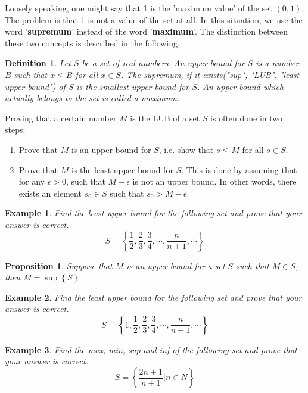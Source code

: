 \documentclass[a4paper,12pt]{article} %
\newtheorem{definition}{Definition}[section]
\newtheorem{example}{Example}[section]
\newtheorem{proposition}{Proposition}[section]
\begin{document}
Loosely speaking, one might say that 1 is the 'maximum value' of the 
set $(0,1)$. The problem is that 1 is not a value of the set at all. 
In this situation, we use the word '\textbf{supremum}' instead of the 
word '\textbf{maximum}'. The distinction between these two concepts is 
described in the following.

\begin{definition}
    Let $S$ be a set of real numbers. An upper bound for $S$ is a 
    number $B$ such that $x \le B$ for all $x \in S$. The supremum,
    if it exists("sup", "LUB", "least upper bound") of $S$ is the 
    smallest upper bound for $S$. An upper bound which actually belongs 
    to the set is called a maximum.
\end{definition}

Proving that a certain number $M$ is the LUB of a set $S$ is often 
done in two steps:
\begin{enumerate}
    \item Prove that $M$ is an upper bound for $S$, i.e. show that 
        $s \le M$ for all $s \in S$.
    \item Prove that $M$ is the least upper bound for $S$. This is 
        done by assuming that for any $\epsilon >0$, such that $M - 
        \epsilon$ is not an upper bound. In other words, there 
        exists an element $s_0 \in S$ such that $s_0 > M - \epsilon$.
\end{enumerate}

\begin{example}
    Find the least upper bound for the following set and prove that your answer is correct.
    \[
        S = \left\{\dfrac{1}{2}, \dfrac{2}{3}, \dfrac{3}{4}, \cdots,
        \dfrac{n}{n+1}, \cdots \right\}
    \]
\end{example}

\begin{proposition}
    Suppose that $M$ is an upper bound for a set $S$ such that $M \in S$, then $M = \sup\left\{S\right\}$
\end{proposition}


\begin{example}
    Find the least upper bound for the following set and prove that your answer is correct.
    \[
        S = \left\{1, \dfrac{1}{2}, \dfrac{2}{3}, \dfrac{3}{4}, \cdots,
        \dfrac{n}{n+1}, \cdots \right\}
    \]
\end{example}

\begin{example}
    Find the max, min, sup and inf of the following set and prove that your answer is correct.
    \[
        S = \left\{ \dfrac{2n+1}{n+1}\left| n \in N \right.\right\}
    \]
\end{example}
\end{document}
